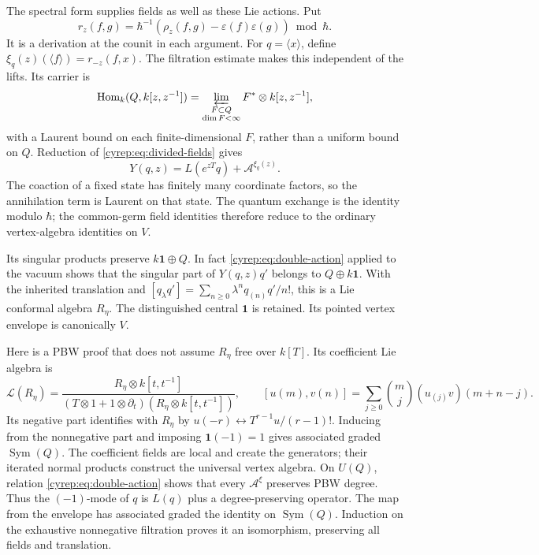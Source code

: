 The spectral form supplies fields as well as these Lie actions.
Put
\[
 r_z(f,g)=\hbar^{-1}
       (\rho_z(f,g)-\varepsilon(f)\varepsilon(g))\bmod\hbar.
\]
It is a derivation at the counit in each argument.
For \(q=\langle x\rangle\), define
\(\xi_q(z)(\langle f\rangle)=r_{-z}(f,x)\).
The filtration estimate makes this independent of the lifts.
Its carrier is
\[
 \operatorname{Hom}_k(Q,k[z,z^{-1}])
 =\varprojlim_{\substack{F\subset Q\\\dim F<\infty}}
                  F^*\otimes k[z,z^{-1}],
\]
with a Laurent bound on each finite-dimensional \(F\), rather
than a uniform bound on \(Q\).
Reduction of \eqref{cyrep:eq:divided-fields} gives
\begin{equation}\label{cyrep:eq:classical-field}
 Y(q,z)=L(e^{zT}q)+\mathcal A^{\xi_q(z)}.
\end{equation}
The coaction of a fixed state has finitely many coordinate
factors, so the annihilation term is Laurent on that state.
The quantum exchange is the identity modulo \(\hbar\);
the common-germ field identities therefore reduce to the
ordinary vertex-algebra identities on \(V\).

Its singular products preserve \(k\mathbf1\oplus Q\).
In fact \eqref{cyrep:eq:double-action} applied to the vacuum
shows that the singular part of \(Y(q,z)q'\) belongs to
\(Q\oplus k\mathbf1\).
With the inherited translation and
\([q_\lambda q']=\sum_{n\geq0}\lambda^nq_{(n)}q'/n!\),
this is a Lie conformal algebra \(R_\eta\).
The distinguished central \(\mathbf1\) is retained.
Its pointed vertex envelope is canonically \(V\).

Here is a PBW proof that does not assume \(R_\eta\) free over
\(k[T]\). Its coefficient Lie algebra is
\[
 \mathcal L(R_\eta)=
 \frac{R_\eta\otimes k[t,t^{-1}]}
 {(T\otimes1+1\otimes\partial_t)(R_\eta\otimes k[t,t^{-1}])},
 \qquad
 [u(m),v(n)]=
       \sum_{j\geq0}\binom mj(u_{(j)}v)(m+n-j).
\]
Its negative part identifies with \(R_\eta\) by
\(u(-r)\leftrightarrow T^{r-1}u/(r-1)!\).
Inducing from the nonnegative part and imposing
\(\mathbf1(-1)=1\) gives associated graded
\(\operatorname{Sym}(Q)\).
The coefficient fields are local and create the generators;
their iterated normal products construct the universal vertex
algebra. On \(U(Q)\), relation \eqref{cyrep:eq:double-action}
shows that every \(\mathcal A^\xi\) preserves PBW degree.
Thus the \((-1)\)-mode of \(q\) is \(L(q)\) plus a
degree-preserving operator. The map from the envelope has
associated graded the identity on \(\operatorname{Sym}(Q)\).
Induction on the exhaustive nonnegative filtration proves it
an isomorphism, preserving all fields and translation.

